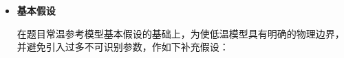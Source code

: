 \documentclass[bwprint]{gmcmthesis}
\numberwithin{figure}{section}
\begin{document}
\begin{itemize}
 将上述区域记为 \(\Omega_{\text{MEA}}\)。氢气、氧气及水的迁移和电化学反应均在该区域内求解。为考虑双极板的储热和导热作用，将热传递区域进一步扩展为
\begin{equation}
\Omega_T = \Omega_{\text{aBP}} \cup \Omega_{\text{MEA}} \cup \Omega_{\text{cBP}},
\tag{4-3}
\end{equation}
\begin{equation}
L_{\text{cell}} = 2L_{\text{BP}} + L_{\text{MEA}} = 4.3267 \, \text{mm}.
\tag{4-4}
\end{equation}

 为保持题目给定五层模型的原坐标形式，我们依旧取阳极 GDL 外侧为 \(x = 0\)，则阳极双极板位于
\begin{equation}
-L_{\text{BP}} \leq x \leq 0,
\tag{4-5}
\end{equation}
 阴极双极板位于
\begin{equation}
L_{\text{MEA}} \leq x \leq L_{\text{MEA}} + L_{\text{BP}}.
\tag{4-6}
\end{equation}

 需要强调的是，双极板在本文中仅扩展热计算区域。其内部不设置气体、水和电化学反应源项，反应气体仍由 GDL 外侧的等效流道边界进入 MEA，而不沿厚度方向穿过致密双极板。因此，气体和水的外边界与热传递域的外边界并不重合。

 根据附件给出的双极板厚度、密度与比热容，两侧双极板对应的单位面积热容为
\begin{equation}
C_{A,\text{BP}} = 2 \times 0.002 \times 1980 \times 766 = 6066.72 \, \text{J m}^{-2}\text{K}^{-1}.
\tag{4-7}
\end{equation}


\item \textbf {基本假设}

\renewcommand{\labelenumi}{\arabic{enumi}.}

 在题目常温参考模型基本假设的基础上，为使低温模型具有明确的物理边界，并避免引入过多不可识别参数，作如下补充假设：


\end{itemize}
\end{document}
